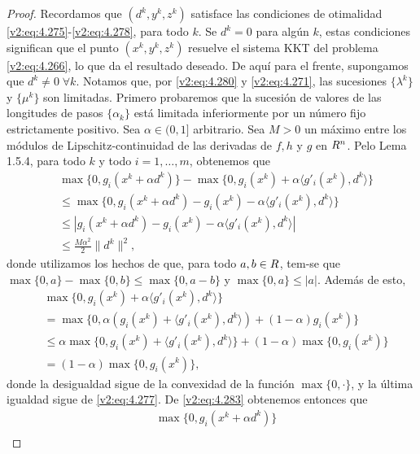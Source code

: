 \begin{proof}
    Recordamos que $(d^k, y^k, z^k)$ satisface las condiciones de otimalidad \eqref{v2:eq:4.275}-\eqref{v2:eq:4.278}, para todo $k$. Se $d^k = 0$ para algún $k$, estas condiciones significan que el punto $(x^k, y^k, z^k)$ resuelve el sistema KKT del problema \eqref{v2:eq:4.266}, lo que da el resultado deseado. De aquí para el frente, supongamos que $d^k \neq 0 \; \forall k$. Notamos que, por \eqref{v2:eq:4.280} y \eqref{v2:eq:4.271}, las sucesiones $\{\lambda^k\}$ y $\{\mu^k\}$ son limitadas.
    Primero probaremos que la sucesión de valores de las longitudes de pasos $\{\alpha_k\}$ está limitada inferiormente por un número fijo estrictamente positivo. Sea $\alpha \in (0, 1]$ arbitrario. Sea $M > 0$ un máximo entre los módulos de Lipschitz-continuidad de las derivadas de $f, h$ y $g$ en $R^n$. Pelo Lema 1.5.4, para todo $k$ y todo $i = 1, \dots, m$, obtenemos que
    \begin{align}
        &\max\{0, g_i(x^k + \alpha d^k)\} - \max\{0, g_i(x^k) + \alpha \langle g'_i(x^k), d^k \rangle\} \nonumber \\
        &\le \max\{0, g_i(x^k + \alpha d^k) - g_i(x^k) - \alpha \langle g'_i(x^k), d^k \rangle\} \nonumber \\
        &\le |g_i(x^k + \alpha d^k) - g_i(x^k) - \alpha \langle g'_i(x^k), d^k \rangle| \nonumber \\
        &\le \frac{M\alpha^2}{2} \|d^k\|^2,
        \label{v2:eq:4.283}
    \end{align}
    donde utilizamos los hechos de que, para todo $a, b \in R$, tem-se que $\max\{0, a\} - \max\{0, b\} \le \max\{0, a - b\}$ y $\max\{0, a\} \le |a|$.
    Además de esto,
    \begin{align*}
        &\max\{0, g_i(x^k) + \alpha \langle g'_i(x^k), d^k \rangle\} \\
        &= \max\{0, \alpha(g_i(x^k) + \langle g'_i(x^k), d^k \rangle) + (1 - \alpha)g_i(x^k)\} \\
        &\le \alpha \max\{0, g_i(x^k) + \langle g'_i(x^k), d^k \rangle\} + (1 - \alpha) \max\{0, g_i(x^k)\} \\
        &= (1 - \alpha) \max\{0, g_i(x^k)\},
    \end{align*}
    donde la desigualdad sigue de la convexidad de la función $\max\{0, \cdot\}$, y la última igualdad sigue de \eqref{v2:eq:4.277}. De \eqref{v2:eq:4.283} obtenemos entonces que
    \begin{align}
        &\max\{0, g_i(x^k + \alpha d^k)\} \nonumber \\

\end{align}
\end{proof}
